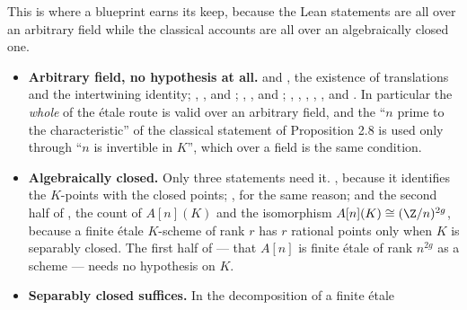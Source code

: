 \begin{remark}\label{rem:av-field-hypotheses}
This is where a blueprint earns its keep, because the Lean statements are all
over an arbitrary field while the classical accounts are all over an
algebraically closed one.
\begin{itemize}
  \item \textbf{Arbitrary field, no hypothesis at all.}
     and , the
    existence of translations and the intertwining identity;
    , ,
     and ;
    , ,
     and ;
    ,
    ,
    , ,
    ,  and
    .  In particular the \emph{whole} of the
    \'etale route is valid over an arbitrary field, and the ``$n$ prime to the
    characteristic'' of the classical statement of Proposition 2.8 is used only
    through ``$n$ is invertible in $K$'', which over a field is the same
    condition.
  \item \textbf{Algebraically closed.}  Only three statements need it.
    , because it identifies the $K$-points
    with the closed points; , for the same reason;
    and the second half of , the count of
    $A[n](K)$ and the isomorphism $A[n](K)\cong(\Z/n)^{2g}$, because a finite
    \'etale $K$-scheme of rank $r$ has $r$ rational points only when $K$ is
    separably closed.  The first half of  --- that
    $A[n]$ is finite \'etale of rank $n^{2g}$ as a scheme --- needs no
    hypothesis on $K$.
  \item \textbf{Separably closed suffices.}  In
     the decomposition of a finite \'etale

\end{itemize}
\end{remark}
